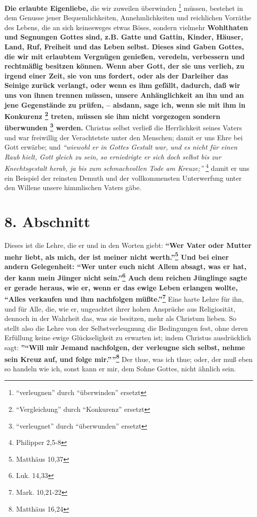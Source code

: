 \textbf{Die erlaubte Eigenliebe,} die wir zuweilen überwinden \footnote{"`verleugnen"' durch "`überwinden"' ersetzt} müssen, bestehet in dem
Genusse jener Bequemlichkeiten, Annehmlichkeiten und reichlichen Vorräthe des
Lebens, die an sich keinesweges etwas Böses, sondern vielmehr \textbf{Wohlthaten und
Segnungen Gottes sind, z.B. Gatte und Gattin, Kinder, Häuser, Land, Ruf,
Freiheit und das Leben selbst. Dieses sind Gaben Gottes, die wir mit erlaubtem
Vergnügen genießen, veredeln, verbessern und rechtmäßig besitzen können. Wenn
aber Gott, der sie uns verlieh, zu irgend einer Zeit, sie von uns fordert, oder
als der Darleiher das Seinige zurück verlangt, oder wenn es ihm gefällt,
dadurch, daß wir uns von ihnen trennen müssen, unsere Anhänglichkeit an ihn und
an jene Gegenstände zu prüfen, -- alsdann, sage ich, wenn sie mit ihm in
Konkurenz \footnote{"`Vergleichung"' durch "`Konkurenz"' ersetzt} treten, müssen sie ihm nicht vorgezogen sondern überwunden \footnote{"`verleugnet"' durch "`überwunden"' ersetzt} werden.}
Christus selbst verließ die Herrlichkeit seines Vaters und war freiwillig der
Verachtetste unter den Menschen; damit er uns Ehre bei Gott erwärbe; und
\textit{"`wiewohl er in Gottes Gestalt war, und es nicht für einen Raub hielt, Gott
gleich zu sein, so erniedrigte er sich doch selbst bis zur Knechtsgestalt
herab, ja bis zum schmachvollen Tode am Kreuze;"'}
\footnote{Philipper 2,5-8}
damit er
uns ein Beispiel der reinsten Demuth und der vollkommensten Unterwerfung unter
den Willene unsere himmlischen Vaters gäbe.

\section{8. Abschnitt} \label{kap4_ab8}

Dieses ist die Lehre, die er und in den Worten giebt:\textbf{ "`Wer Vater oder Mutter
mehr liebt, als mich, der ist meiner nicht werth."'\footnote{Matthäus  10,37} Und
bei einer andern Gelegenheit: "`Wer unter euch nicht Allem absagt, was er hat,
der kann mein Jünger nicht sein."'\footnote{Luk. 14,33} Auch dem reichen
Jünglinge sagte er gerade heraus, wie er, wenn er das ewige Leben erlangen
wollte, "`Alles verkaufen und ihm nachfolgen müßte."'\footnote{Mark. 10,21-22}}
Eine harte Lehre für ihn, und für Alle, die, wie er, ungeachtet ihrer hohen
Ansprüche aus Religiosität, dennoch in der Wahrheit das, was sie besitzen, mehr
als Christum lieben. So stellt also die Lehre von der Selbstverleugnung die
Bedingungen fest, ohne deren Erfüllung keine ewige Glückseligkeit zu erwarten
ist; indem Christus ausdrücklich sagt: \textbf{''"`Will mir Jemand nachfolgen, der
verleugne sich selbst, nehme sein Kreuz auf, und folge mir."'''\footnote{Matthäus 
16,24}} Der thue, was ich thue; oder, der muß eben so handeln wie ich, sonst kann
er mir, dem Sohne Gottes, nicht ähnlich sein.

